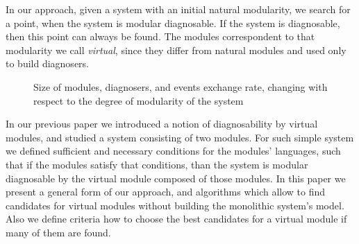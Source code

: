 \documentclass[a4paper, 10pt, conference]{ieeeconf}
\begin{document}
In our approach, given a system with an initial natural modularity, we search
for a point, when the system is modular diagnosable. If the system is diagnosable,
then this point can always be found. The modules correspondent to that
modularity we call \emph{virtual}, since they differ from natural modules and
used only to build diagnosers.

\begin{figure}
\caption{Size of modules, diagnosers, and events exchange rate, changing 
with respect to the degree of modularity of the system}
\label{fig:curves}
\end{figure}

In our previous paper \cite{myadzelets_virtual_2013} we introduced a notion of
diagnosability by virtual modules, and studied a system consisting of
two modules. For such simple system we defined sufficient and necessary
conditions for the modules' languages, such that if the modules satisfy that
conditions, than the system is modular diagnosable by the virtual module
composed of those modules. In this paper we present a general form of our
approach, and algorithms which allow to find candidates for virtual modules
without building the monolithic system's model. Also we define criteria how to
choose the best candidates for a virtual module if many of them are found.
\end{document}
